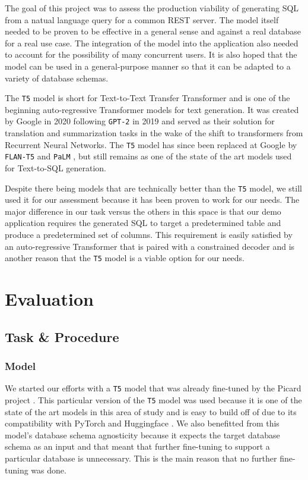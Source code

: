 \documentclass[11pt]{article}
\begin{document}
The goal of this project was to assess the production viability of generating SQL from a natual language query for a common REST server. The model itself needed to be proven to be effective in a general sense and against a real database for a real use case. The integration of the model into the application also needed to account for the possibility of many concurrent users. It is also hoped that the model can be used in a general-purpose manner so that it can be adapted to a variety of database schemas.

The \texttt{T5} model \citep{raffel2020exploring} is short for Text-to-Text Transfer Transformer and is one of the beginning auto-regressive Transformer models for text generation. It was created by Google in 2020 following \texttt{GPT-2} in 2019 \citep{radfordgpt2} and served as their solution for translation and summarization tasks in the wake of the shift to transformers from Recurrent Neural Networks. The \texttt{T5} model has since been replaced at Google by \texttt{FLAN-T5} \citep{chung2022scaling} and \texttt{PaLM} \citep{chowdhery2022palm}, but still remains as one of the state of the art models used for Text-to-SQL generation.

Despite there being models that are technically better than the \texttt{T5} model, we still used it for our assessment because it has been proven to work for our needs. The major difference in our task versus the others in this space is that our demo application requires the generated SQL to target a predetermined table and produce a predetermined set of columns. This requirement is easily satisfied by an auto-regressive Transformer that is paired with a constrained decoder and is another reason that the \texttt{T5} model is a viable option for our needs.

\section{Evaluation} \label{sec:eval}


\subsection{Task \& Procedure}

\subsubsection{Model}

We started our efforts with a \texttt{T5} model that was already fine-tuned by the Picard project \citep{scholak2021picard}. This particular version of the \texttt{T5} model was used because it is one of the state of the art models in this area of study and is easy to build off of due to its compatibility with PyTorch \citep{pytorch} and Huggingface \citep{wolf2020huggingfaces}. We also benefitted from this model's database schema agnosticity because it expects the target database schema as an input and that meant that further fine-tuning to support a particular database is unnecessary. This is the main reason that no further fine-tuning was done.
\end{document}
